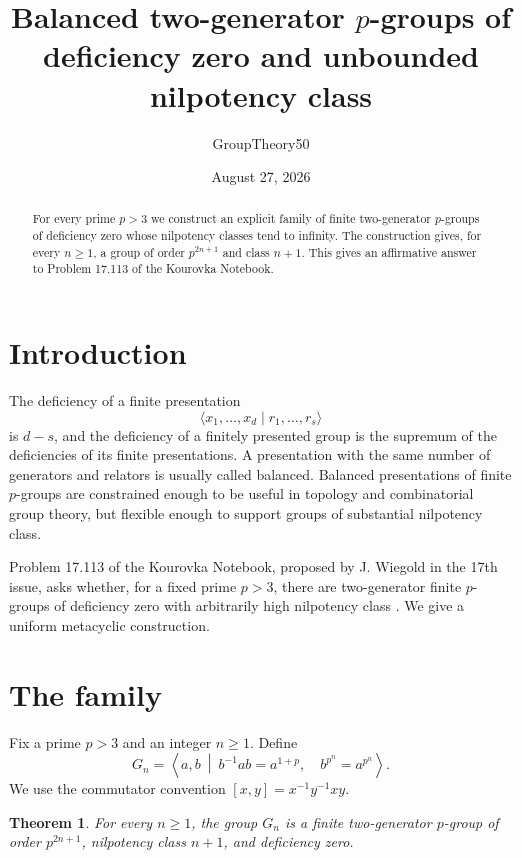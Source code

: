 \documentclass[11pt]{amsart}
\title{Balanced two-generator $p$-groups of deficiency zero and unbounded nilpotency class}
\author{GroupTheory50}
\date{August 27, 2026}
\newtheorem{theorem}{Theorem}[section]
\theoremstyle{definition}
\begin{document}
\begin{abstract}
For every prime $p>3$ we construct an explicit family of finite two-generator $p$-groups of deficiency zero whose nilpotency classes tend to infinity.  The construction gives, for every $n\geq1$, a group of order $p^{2n+1}$ and class $n+1$.  This gives an affirmative answer to Problem 17.113 of the Kourovka Notebook.
\end{abstract}
\maketitle

\section{Introduction}
The deficiency of a finite presentation
\[
  \langle x_1,\dots,x_d\mid r_1,\dots,r_s\rangle
\]
is $d-s$, and the deficiency of a finitely presented group is the supremum of the deficiencies of its finite presentations.  A presentation with the same number of generators and relators is usually called balanced.  Balanced presentations of finite $p$-groups are constrained enough to be useful in topology and combinatorial group theory, but flexible enough to support groups of substantial nilpotency class.

Problem 17.113 of the Kourovka Notebook, proposed by J. Wiegold in the 17th issue, asks whether, for a fixed prime $p>3$, there are two-generator finite $p$-groups of deficiency zero with arbitrarily high nilpotency class \cite{kourovka}.  We give a uniform metacyclic construction.

\section{The family}
Fix a prime $p>3$ and an integer $n\geq1$.  Define
\[
 G_n=\left\langle a,b\ \middle|\ b^{-1}ab=a^{1+p},\quad b^{p^n}=a^{p^n}\right\rangle.
\]
We use the commutator convention $[x,y]=x^{-1}y^{-1}xy$.

\begin{theorem}\label{thm:main}
For every $n\geq1$, the group $G_n$ is a finite two-generator $p$-group of order $p^{2n+1}$, nilpotency class $n+1$, and deficiency zero.
\end{theorem}
\end{document}
